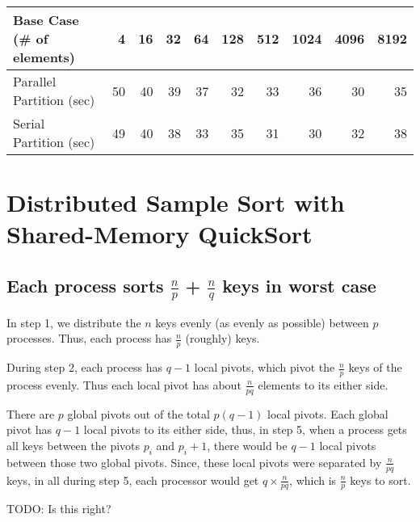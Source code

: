 \documentclass{article}
\begin{document}
\begin{center}
  \begin{tabular}{| l | r | r | r | r | r | r | r | r | r |}
    \hline
    Base Case (\# of elements) & 4 & 16 & 32 & 64 & 128 & 512 & 1024 & 4096 & 8192 \\ \hline
    Parallel Partition (sec) & 50 & 40 & 39 & 37 & 32 & 33 & 36 & 30 & 35 \\ \hline
    Serial Partition (sec) & 49 & 40 & 38 & 33 & 35 & 31 & 30 & 32 & 38 \\ \hline
  \end{tabular}
\end{center}


\section{Distributed Sample Sort with Shared-Memory QuickSort}

\subsection{Each process sorts $\frac{n}{p}$ + $\frac{n}{q}$ keys in worst case}
In step 1, we distribute the $n$ keys evenly (as evenly as possible)
between $p$ processes. Thus, each process has $\frac{n}{p}$ (roughly) keys.

During step 2, each process has $q-1$ local pivots, which pivot the 
$\frac{n}{p}$ keys of the process evenly. Thus each local pivot has 
about $\frac{n}{pq}$ elements to its either side. 

There are $p$ global pivots out of the total $p(q-1)$ local pivots.
Each global pivot has $q-1$ local pivots to its either side, thus, 
in step 5, when a process gets all keys between the pivots $p_i$ and 
$p_i+1$, there would be $q-1$ local pivots between those two global
pivots. Since, these local pivots were separated by 
$\frac{n}{pq}$ keys, in all during step 5, each processor would get
$q \times \frac{n}{pq}$, which is $\frac{n}{p}$ keys to sort.

TODO: Is this right?
\end{document}
